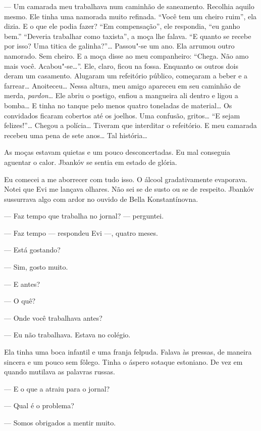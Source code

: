 --- Um camarada meu trabalhava num caminhão de saneamento.
Recolhia aquilo mesmo. Ele tinha uma namorada muito refinada. ``Você tem
um cheiro ruim'', ela dizia. E o que ele podia fazer? ``Em
compensação'', ele respondia, ``eu ganho bem.'' ``Deveria trabalhar como
taxista'', a moça lhe falava. ``E quanto se recebe por isso? Uma titica
de galinha?''\ldots{} Passou"-se um ano. Ela arrumou outro namorado. Sem
cheiro. E a moça disse ao meu companheiro: ``Chega. Não amo mais você.
Acabou"-se\ldots{}''. Ele, claro, ficou na fossa. Enquanto os outros dois
deram um casamento. Alugaram um refeitório público, começaram a beber e
a farrear\ldots{} Anoiteceu\ldots{} Nessa altura, meu amigo apareceu em seu
caminhão de merda, \emph{pardon}\ldots{} Ele abriu o postigo, enfiou a
mangueira ali dentro e ligou a bomba\ldots{} E tinha no tanque pelo menos
quatro toneladas de material\ldots{} Os convidados ficaram cobertos até os
joelhos. Uma confusão, gritos\ldots{} ``E sejam felizes!''\ldots{} Chegou a
polícia\ldots{} Tiveram que interditar o refeitório. E meu camarada recebeu
uma pena de sete anos\ldots{} Tal história\ldots{}

As moças estavam quietas e um pouco desconcertadas. Eu mal conseguia
aguentar o calor. Jbankóv se sentia em estado de glória.

Eu comecei a me aborrecer com tudo isso. O álcool gradativamente
evaporava. Notei que Evi me lançava olhares. Não sei se de susto ou se
de respeito. Jbankóv sussurrava algo com ardor no ouvido de Bella
Konstantínovna.

--- Faz tempo que trabalha no jornal? --- perguntei.

--- Faz tempo --- respondeu Evi ---, quatro meses.

--- Está gostando?

--- Sim, gosto muito.

--- E antes?

--- O quê?

--- Onde você trabalhava antes?

--- Eu não trabalhava. Estava no colégio.

Ela tinha uma boca infantil e uma franja felpuda. Falava às pressas, de
maneira sincera e um pouco sem fôlego. Tinha o áspero sotaque estoniano.
De vez em quando mutilava as palavras russas.

--- E o que a atraiu para o jornal?

--- Qual é o problema?

--- Somos obrigados a mentir muito.


